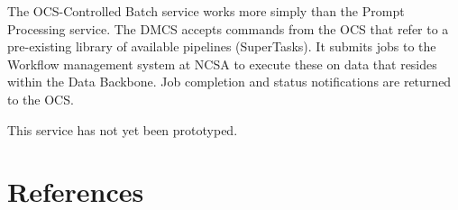 \documentclass[DM,lsstdraft,toc]{lsstdoc}
\begin{document}
The OCS-Controlled Batch service works more simply than the Prompt Processing
service.  The DMCS accepts commands from the OCS that refer to a pre-existing
library of available pipelines (SuperTasks).  It submits jobs to the Workflow
management system at NCSA to execute these on data that resides within the Data
Backbone.  Job completion and status notifications are returned to the OCS.

This service has not yet been prototyped.

\section{References\label{references}}
\renewcommand{\refname}{}

\end{document}
